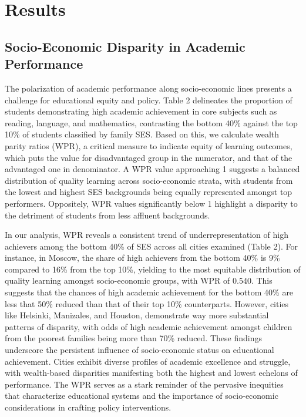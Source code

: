 \documentclass{article}
\begin{document}
\hypertarget{results}{%
\section{Results}\label{results}}

\hypertarget{socio-economic-disparity-in-academic-performance}{%
\subsection{Socio-Economic Disparity in Academic
Performance}\label{socio-economic-disparity-in-academic-performance}}

The polarization of academic performance along socio-economic lines
presents a challenge for educational equity and policy. Table 2
delineates the proportion of students demonstrating high academic
achievement in core subjects such as reading, language, and mathematics,
contrasting the bottom 40\% against the top 10\% of students classified
by family SES. Based on this, we calculate wealth parity ratios (WPR), a
critical measure to indicate equity of learning outcomes, which puts the
value for disadvantaged group in the numerator, and that of the
advantaged one in denominator. A WPR value approaching 1 suggests a
balanced distribution of quality learning across socio-economic strata,
with students from the lowest and highest SES backgrounds being equally
represented amongst top performers. Oppositely, WPR values significantly
below 1 highlight a disparity to the detriment of students from less
affluent backgrounds.

In our analysis, WPR reveals a consistent trend of underrepresentation
of high achievers among the bottom 40\% of SES across all cities
examined (Table 2). For instance, in Moscow, the share of high achievers
from the bottom 40\% is 9\% compared to 16\% from the top 10\%, yielding
to the most equitable distribution of quality learning amongst
socio-economic groups, with WPR of 0.540. This suggests that the chances
of high academic achievement for the bottom 40\% are less that 50\%
reduced than that of their top 10\% counterparts. However, cities like
Helsinki, Manizales, and Houston, demonstrate way more substantial
patterns of disparity, with odds of high academic achievement amongst
children from the poorest families being more than 70\% reduced. These
findings underscore the persistent influence of socio-economic status on
educational achievement. Cities exhibit diverse profiles of academic
excellence and struggle, with wealth-based disparities manifesting both
the highest and lowest echelons of performance. The WPR serves as a
stark reminder of the pervasive inequities that characterize educational
systems and the importance of socio-economic considerations in crafting
policy interventions.
\end{document}

